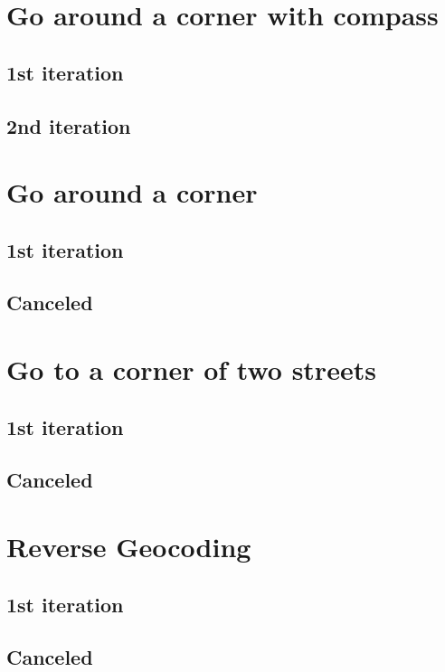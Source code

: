 		\section{Go around a corner with compass}
			\subsection{1st iteration}
			\subsection{2nd iteration}
		\section{Go around a corner}
			\subsection{1st iteration}
			\subsection{Canceled}
		\section{Go to a corner of two streets}
			\subsection{1st iteration}
			\subsection{Canceled}
		\section{Reverse Geocoding}
			\subsection{1st iteration}
			\subsection{Canceled}
		
		